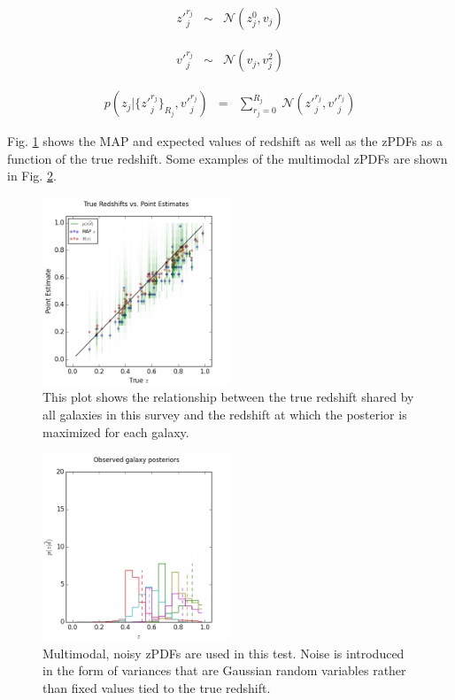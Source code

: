 \documentclass[preprint]{aastex}
\begin{document}
\begin{eqnarray}
\label{eq:zshift-milti}
z'^{r_{j}}_{j} &\sim& \mathcal{N}(z_{j}^{0},v_{j})
\end{eqnarray}

\begin{eqnarray}
\label{eq:znoise-multi}
v'^{r_{j}}_{j} &\sim& \mathcal{N}(v_{j},v^{2}_{j})
\end{eqnarray}

\begin{eqnarray}
\label{eq:zmany}
p(z_{j}|\{z'^{r_{j}}_{j}\}_{R_{j}},v'^{r_{j}}_{j}) &=& \sum_{r_{j}=0}^{R_{j}}\ 
\mathcal{N}(z'^{r_{j}}_{j},v'^{r_{j}}_{j})
\end{eqnarray}

Fig. \ref{fig:multicat} shows the MAP and expected values of redshift as well 
as the zPDFs as a function of the true redshift.  Some examples of the 
multimodal zPDFs are shown in Fig. \ref{fig:multipzs}.

\begin{figure}
\includegraphics[width=0.5\textwidth]{multi/truevmap.png}
\caption{This plot shows the relationship between the true redshift shared by 
all galaxies in this survey and the redshift at which the posterior is 
maximized for each galaxy.}
\label{fig:multicat}
\end{figure}

\begin{figure}
\includegraphics[width=0.5\textwidth]{multi/samplepzs.png}
\caption{Multimodal, noisy zPDFs are used in this test.  Noise is introduced in 
the form of variances that are Gaussian random variables rather than fixed 
values tied to the true redshift.}
\label{fig:multipzs}
\end{figure}
\end{document}
